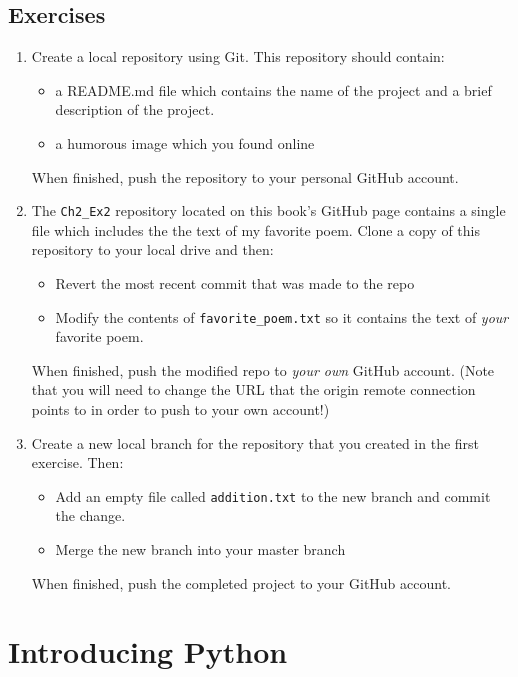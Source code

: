\documentclass{book}
\begin{document}
\section{Exercises}
\begin{enumerate}
	\item Create a local repository using Git. This repository should contain:
	\begin{itemize}
		\item a README.md file which contains the name of the project and a brief description of the project. 
		\item a humorous image which you found online 
	\end{itemize}
		When finished, push the repository to your personal GitHub account.
	\item The \texttt{Ch2\_Ex2} repository located on this book's GitHub page contains a single file which includes the the text of my favorite poem. Clone a copy of this repository to your local drive and then:
	\begin{itemize}
		\item Revert the most recent commit that was made to the repo
		\item Modify the contents of \texttt{favorite\_poem.txt} so it contains the text of \textit{your} favorite poem.
	\end{itemize}
	When finished, push the modified repo to \textit {your own} GitHub account. (Note that you will need to change the URL that the origin remote connection points to in order to push to your own account!)
	\item Create a new local branch for the repository that you created in the first exercise. Then:
	\begin {itemize}
		\item Add an empty file called \texttt{addition.txt} to the new branch and commit the change.
		\item Merge the new branch into your master branch
	\end {itemize}
	When finished, push the completed project to your GitHub account.
\end{enumerate}

\chapter{Introducing Python}
\end{document}
